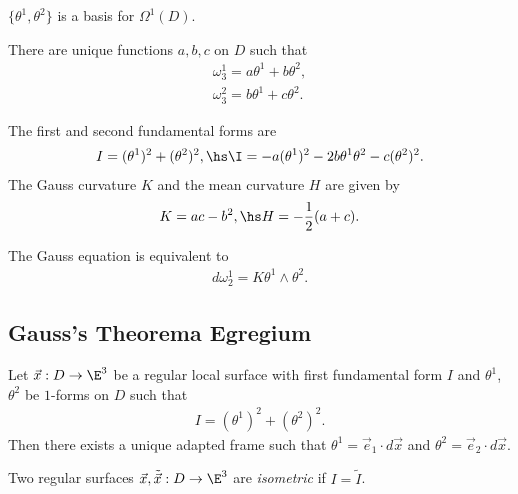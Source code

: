 \documentclass{article}
\begin{document}
\begin{lemma}[Notes 11.3]
    $\{\theta^1, \theta^2\}$ is a basis for $\Omega^1(D)$.
\end{lemma}

\begin{lemma}[Notes 11.4]
    There are unique functions $a,b,c$ on $D$ such that
    \begin{align*}
        \omega_3^1 = a\theta^1+b\theta^2, \\
        \omega_3^2 = b\theta^1+c\theta^2.
    \end{align*}
\end{lemma}

\begin{proposition}[Notes 11.5]
    The first and second fundamental forms are
    \begin{align*}
        I = (\theta^1)^2 + (\theta^2)^2,\hs
        \I = -a(\theta^1)^2-2b\theta^1\theta^2-c(\theta^2)^2.
    \end{align*}
    The Gauss curvature $K$ and the mean curvature $H$ are given by
    \begin{align*}
        K=ac-b^2, \hs H=-\frac{1}{2}(a+c).
    \end{align*}
\end{proposition}

\begin{proposition}[Notes 11.6]
    The Gauss equation is equivalent to
    \begin{align*}
        d\omega_2^1 = K\theta^1\wedge\theta^2.
    \end{align*}
\end{proposition}

\subsection{Gauss's Theorema Egregium}

\begin{proposition}[Notes 11.9]
    Let $\vec x:D\to\E^3$ be a regular local surface with first fundamental form
    $I$ and $\theta^1$, $\theta^2$ be $1$-forms on $D$ such that
    \begin{align*}
        I = (\theta^1)^2+(\theta^2)^2.
    \end{align*}
    Then there exists a unique adapted frame such that $\theta^1=\vec e_1\cdot d\vec x$
    and $\theta^2 = \vec e_2 \cdot d\vec x$.
\end{proposition}

\begin{definition}
    Two regular surfaces $\vec x,\tilde{\vec x}:D\to\E^3$ are \emph{isometric}
    if $I=\tilde I$.
\end{definition}
\end{document}
